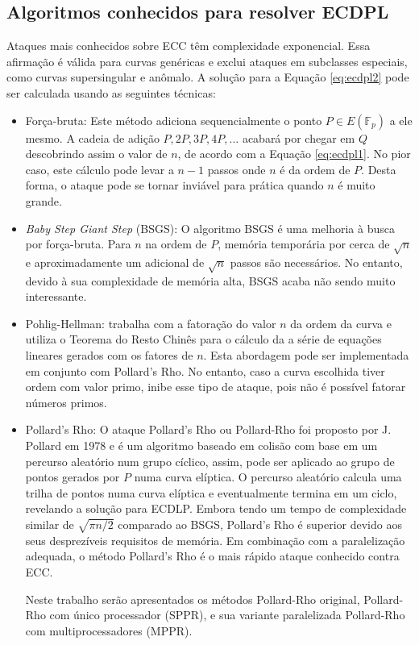%
%
\subsection{Algoritmos conhecidos para resolver ECDPL}
Ataques mais conhecidos sobre ECC têm complexidade exponencial. Essa afirmação é válida para curvas genéricas e exclui ataques em subclasses especiais, como curvas supersingular e anômalo. A solução para a Equação \ref{eq:ecdpl2} pode ser calculada usando as seguintes técnicas: \cite{Pelzl:2006}

\begin{itemize}
\item Força-bruta: Este método adiciona sequencialmente o ponto $P \in E(\mathbb{F}_p)$ a ele mesmo. A cadeia de adição $P, 2P, 3P, 4P, ...$ acabará por chegar em \(Q\) descobrindo assim o valor de \(n\), de acordo com a Equação \ref{eq:ecdpl1}. No pior caso, este cálculo pode levar a $n - 1$ passos onde \(n\) é da ordem de \(P\). Desta forma, o ataque pode se tornar inviável para prática quando \(n\) é muito grande.
\item \textit{Baby Step Giant Step} (BSGS): O algoritmo BSGS é uma melhoria à busca por força-bruta. Para \(n\) na ordem de \(P\), memória temporária por cerca de $\sqrt{n}$ e aproximadamente um adicional de $\sqrt{n}$ passos são necessários. No entanto, devido à sua complexidade de memória alta, BSGS acaba não sendo muito interessante.
\item Pohlig-Hellman: trabalha com a fatoração do valor \(n\) da ordem da curva e utiliza o Teorema do Resto Chinês para o cálculo da a série de equações lineares gerados com os fatores de \(n\). Esta abordagem pode ser implementada em conjunto com Pollard's Rho. No entanto, caso a curva escolhida tiver ordem com valor primo, inibe esse tipo de ataque, pois não é possível fatorar números primos.
\item Pollard's Rho: O ataque Pollard's Rho ou Pollard-Rho foi proposto por J. Pollard em 1978 e é um algoritmo baseado em colisão com base em um percurso aleatório num grupo cíclico, assim, pode ser aplicado ao grupo de pontos gerados por \(P\) numa curva elíptica. O percurso aleatório calcula uma trilha de pontos numa curva elíptica e eventualmente termina em um ciclo, revelando a solução para ECDLP. \cite{Pollard:1978} Embora tendo um tempo de complexidade similar de $\sqrt{\pi n/2}$ comparado ao BSGS, Pollard's Rho é superior devido aos seus desprezíveis requisitos de memória. Em combinação com a paralelização adequada, o método Pollard's Rho é o mais rápido ataque conhecido contra ECC. \cite{Pelzl:2006}

Neste trabalho serão apresentados os métodos Pollard-Rho original, Pollard-Rho com único processador (SPPR), e sua variante paralelizada Pollard-Rho com multiprocessadores (MPPR).
\end{itemize}

